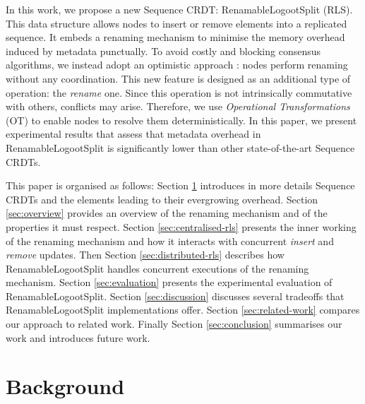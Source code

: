 \documentclass[10pt,journal,compsoc]{IEEEtran}
\begin{document}
In this work, we propose a new Sequence \ac{CRDT}: RenamableLogootSplit (RLS).
This data structure allows nodes to insert or remove elements into a replicated sequence.
It embeds a renaming mechanism to minimise the memory overhead induced by metadata punctually.
To avoid costly and blocking consensus algorithms, we instead adopt an optimistic approach : nodes perform renaming without any coordination.
This new feature is designed as an additional type of operation: the \emph{rename} one.
Since this operation is not intrinsically commutative with others, conflicts may arise.
Therefore, we use \emph{Operational Transformations} (OT) \cite{10.1145/67544.66963,10.1145/289444.289469,4668339} to enable nodes to resolve them deterministically.
In this paper, we present experimental results that assess that metadata overhead in RenamableLogootSplit is significantly lower than other state-of-the-art Sequence \acp{CRDT}.

This paper is organised as follows:
Section \ref{sec:background} introduces in more details Sequence \acp{CRDT} and the elements leading to their evergrowing overhead.
Section \ref{sec:overview} provides an overview of the renaming mechanism and of the properties it must respect.
Section \ref{sec:centralised-rls} presents the inner working of the renaming mechanism and how it interacts with concurrent \emph{insert} and \emph{remove} updates.
Then Section \ref{sec:distributed-rls} describes how RenamableLogootSplit handles concurrent executions of the renaming mechanism.
Section \ref{sec:evaluation} presents the experimental evaluation of RenamableLogootSplit.
Section \ref{sec:discussion} discusses several tradeoffs that RenamableLogootSplit implementations offer.
Section \ref{sec:related-work} compares our approach to related work.
Finally Section \ref{sec:conclusion} summarises our work and introduces future work.


\section{Background}
\label{sec:background}
\end{document}
